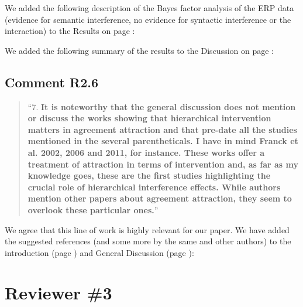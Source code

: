 \documentclass[12pt]{article}
\begin{document}
\begin{quote}
\end{quote}

\noindent We added the following description of the Bayes factor analysis of the ERP data (evidence for semantic interference, no evidence for syntactic interference or the interaction) to the Results on page \pageref{ERP_results3}:

\begin{quote}
\end{quote}

\noindent We added the following summary of the results to the Discussion on page \pageref{ERP_discussion}:

\begin{quote}
\end{quote}

\subsection*{Comment R2.6}
\begin{quote}
``7. \textbf{It is noteworthy that the general discussion does not mention or discuss the works showing that hierarchical intervention matters in agreement attraction and that pre-date all the studies mentioned in the several parentheticals. I have in mind Franck et al. 2002, 2006 and 2011, for instance. These works offer a treatment of attraction in terms of intervention and, as far as my knowledge goes, these are the first studies highlighting the crucial role of hierarchical interference effects. While authors mention other papers about agreement attraction, they seem to overlook these particular ones.}''
\end{quote}

We agree that this line of work is highly relevant for our paper. We have added the suggested references (and some more by the same and other authors) to the introduction (page \pageref{franck_refs}) and General Discussion (page \pageref{future_work}):

\begin{quote}
\end{quote}

\begin{quote}
\end{quote}

\section*{Reviewer \#3} 
\end{document}
